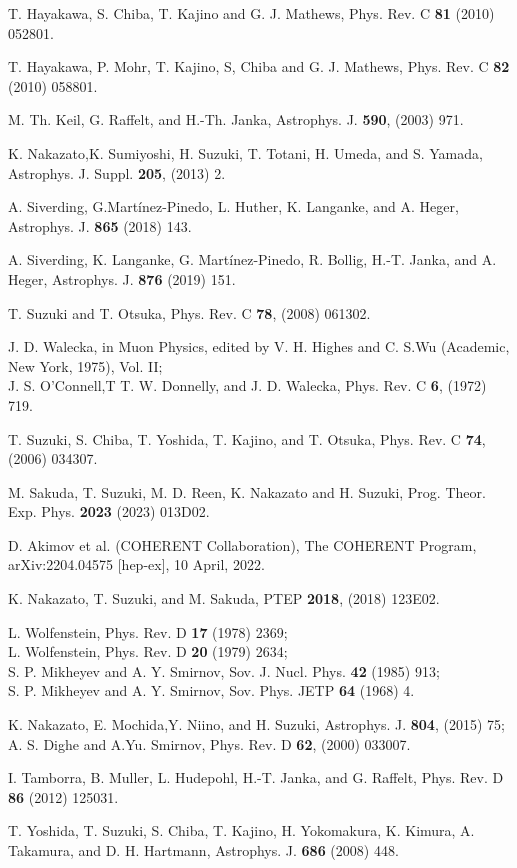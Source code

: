 \documentclass[preprint,12pt]{elsarticle}
\begin{document}
\begin{thebibliography}{99}
T. Hayakawa, S. Chiba, T. Kajino and G. J. Mathews, Phys. Rev. C {\bf 81} (2010) 052801.

T. Hayakawa, P. Mohr, T. Kajino, S, Chiba and G. J. Mathews, Phys. Rev. C {\bf 82} (2010) 058801.

M. Th. Keil, G. Raffelt, and H.-Th. Janka, Astrophys. J. {\bf 590}, (2003) 971.

K. Nakazato,K. Sumiyoshi, H. Suzuki, T. Totani, H. Umeda, and S. Yamada, Astrophys. J. Suppl. {\bf 205}, (2013) 2.

A. Siverding, G.Mart\'inez-Pinedo, L. Huther, K. Langanke, and A. Heger, Astrophys. J. {\bf 865} (2018) 143. 

A. Siverding, K. Langanke, G. Mart\'inez-Pinedo, R. Bollig, H.-T. Janka, and A. Heger, Astrophys. J. {\bf 876} (2019) 151. 
 
T. Suzuki and T. Otsuka, Phys. Rev. C {\bf 78},  (2008) 061302. 

J. D. Walecka, in Muon Physics, edited by V. H. Highes and C. S.Wu (Academic, New York, 1975), Vol. II;\\
J. S. O'Connell,T T. W. Donnelly, and J. D. Walecka, Phys. Rev. C {\bf 6}, (1972) 719. 

T. Suzuki, S. Chiba, T. Yoshida, T. Kajino, and T. Otsuka, Phys. Rev. C {\bf 74}, (2006) 034307.

M. Sakuda, T. Suzuki, M. D. Reen, K. Nakazato and H. Suzuki, Prog. Theor. Exp. Phys. {\bf 2023} (2023) 013D02. 

D. Akimov et al. (COHERENT Collaboration), The COHERENT Program, arXiv:2204.04575 [hep-ex], 10 April, 2022.

K. Nakazato, T. Suzuki, and M. Sakuda, PTEP {\bf 2018}, (2018) 123E02.

L. Wolfenstein, Phys. Rev. D {\bf 17} (1978) 2369;\\
L. Wolfenstein, Phys. Rev. D {\bf 20} (1979) 2634;\\
S. P. Mikheyev and A. Y. Smirnov, Sov. J. Nucl. Phys. {\bf 42} (1985) 913;\\
S. P. Mikheyev and A. Y. Smirnov, Sov. Phys. JETP {\bf 64} (1968) 4.

K. Nakazato, E. Mochida,Y. Niino, and H. Suzuki, Astrophys. J. {\bf 804}, (2015) 75;\\
A. S. Dighe and A.Yu. Smirnov, Phys. Rev. D {\bf 62}, (2000) 033007.

I. Tamborra, B. Muller, L. Hudepohl, H.-T. Janka, and G. Raffelt, Phys. Rev. D {\bf 86} (2012) 125031.

T. Yoshida, T. Suzuki, S. Chiba, T. Kajino, H. Yokomakura, K. Kimura, A. Takamura, and D. H. Hartmann,
Astrophys. J. {\bf 686} (2008) 448.


\end{thebibliography}
\end{document}
